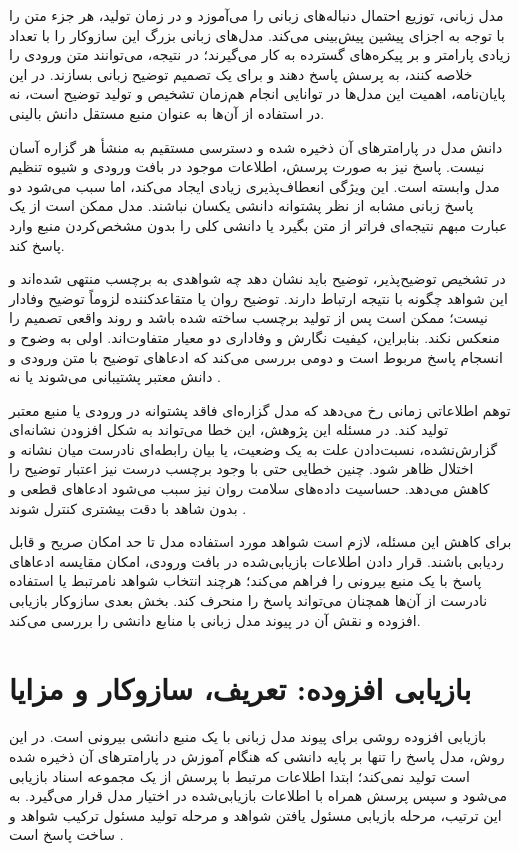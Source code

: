مدل زبانی، توزیع احتمال دنباله‌های زبانی را می‌آموزد و در زمان تولید، هر جزء متن را با توجه به اجزای پیشین پیش‌بینی می‌کند. مدل‌های زبانی بزرگ این سازوکار را با تعداد زیادی پارامتر و بر پیکره‌های گسترده به کار می‌گیرند؛ در نتیجه، می‌توانند متن ورودی را خلاصه کنند، به پرسش پاسخ دهند و برای یک تصمیم توضیح زبانی بسازند. در این پایان‌نامه، اهمیت این مدل‌ها در توانایی انجام هم‌زمان تشخیص و تولید توضیح است، نه در استفاده از آن‌ها به عنوان منبع مستقل دانش بالینی.

دانش مدل در پارامترهای آن ذخیره شده و دسترسی مستقیم به منشأ هر گزاره آسان نیست. پاسخ نیز به صورت پرسش، اطلاعات موجود در بافت ورودی و شیوه تنظیم مدل وابسته است. این ویژگی انعطاف‌پذیری زیادی ایجاد می‌کند، اما سبب می‌شود دو پاسخ زبانی مشابه از نظر پشتوانه دانشی یکسان نباشند. مدل ممکن است از یک عبارت مبهم نتیجه‌ای فراتر از متن بگیرد یا دانشی کلی را بدون مشخص‌کردن منبع وارد پاسخ کند.

در تشخیص توضیح‌پذیر، توضیح باید نشان دهد چه شواهدی به برچسب منتهی شده‌اند و این شواهد چگونه با نتیجه ارتباط دارند. توضیح روان یا متقاعدکننده لزوماً توضیح وفادار نیست؛ ممکن است پس از تولید برچسب ساخته شده باشد و روند واقعی تصمیم را منعکس نکند. بنابراین، کیفیت نگارش و وفاداری دو معیار متفاوت‌اند. اولی به وضوح و انسجام پاسخ مربوط است و دومی بررسی می‌کند که ادعاهای توضیح با متن ورودی و دانش معتبر پشتیبانی می‌شوند یا نه \cite{joyce2023explainable}.

توهم اطلاعاتی زمانی رخ می‌دهد که مدل گزاره‌ای فاقد پشتوانه در ورودی یا منبع معتبر تولید کند. در مسئله این پژوهش، این خطا می‌تواند به شکل افزودن نشانه‌ای گزارش‌نشده، نسبت‌دادن علت به یک وضعیت، یا بیان رابطه‌ای نادرست میان نشانه و اختلال ظاهر شود. چنین خطایی حتی با وجود برچسب درست نیز اعتبار توضیح را کاهش می‌دهد. حساسیت داده‌های سلامت روان نیز سبب می‌شود ادعاهای قطعی و بدون شاهد با دقت بیشتری کنترل شوند \cite{who2023safeai}.

برای کاهش این مسئله، لازم است شواهد مورد استفاده مدل تا حد امکان صریح و قابل ردیابی باشند. قرار دادن اطلاعات بازیابی‌شده در بافت ورودی، امکان مقایسه ادعاهای پاسخ با یک منبع بیرونی را فراهم می‌کند؛ هرچند انتخاب شواهد نامرتبط یا استفاده نادرست از آن‌ها همچنان می‌تواند پاسخ را منحرف کند. بخش بعدی سازوکار بازیابی افزوده و نقش آن در پیوند مدل زبانی با منابع دانشی را بررسی می‌کند.

\section{بازیابی افزوده: تعریف، سازوکار و مزایا}

بازیابی افزوده روشی برای پیوند مدل زبانی با یک منبع دانشی بیرونی است. در این روش، مدل پاسخ را تنها بر پایه دانشی که هنگام آموزش در پارامترهای آن ذخیره شده است تولید نمی‌کند؛ ابتدا اطلاعات مرتبط با پرسش از یک مجموعه اسناد بازیابی می‌شود و سپس پرسش همراه با اطلاعات بازیابی‌شده در اختیار مدل قرار می‌گیرد. به این ترتیب، مرحله بازیابی مسئول یافتن شواهد و مرحله تولید مسئول ترکیب شواهد و ساخت پاسخ است \cite{lewis2020retrieval}.

